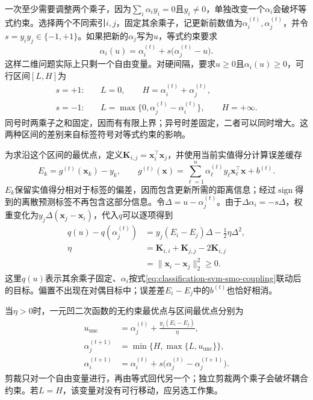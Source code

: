 一次至少需要调整两个乘子，因为$\sum_i\alpha_i y_i=0$且$y_i\ne0$，单独改变一个$\alpha_i$会破坏等式约束。选择两个不同索引$i,j$，固定其余乘子，记更新前数值为$\alpha_i^{(t)},\alpha_j^{(t)}$，并令$s=y_i y_j\in\{-1,+1\}$。如果把新的$\alpha_j$写为$u$，等式约束要求
\begin{equation}
  \alpha_i(u)
  =\alpha_i^{(t)}
    +s\bigl(\alpha_j^{(t)}-u\bigr).
  \label{eq:classification-svm-smo-coupling}
\end{equation}
这样二维问题实际上只剩一个自由变量。对硬间隔，要求$u\ge0$且$\alpha_i(u)\ge0$，可行区间$[L,H]$为
\begin{equation}
  \begin{aligned}
    s=+1:\quad&
      L=0,\qquad H=\alpha_i^{(t)}+\alpha_j^{(t)},\\
    s=-1:\quad&
      L=\max\{0,\alpha_j^{(t)}-\alpha_i^{(t)}\},
      \qquad H=+\infty.
  \end{aligned}
  \label{eq:classification-svm-smo-hard-interval}
\end{equation}
同号时两乘子之和固定，因而有有限上界；异号时差固定，二者可以同时增大。这两种区间的差别来自标签符号对等式约束的影响。

为求沿这个区间的最优点，定义$\bm{K}_{i,j}=\bm{x}_i^{\top}\bm{x}_j$，并使用当前实值得分计算误差缓存
\[
  E_k=g^{(t)}(\bm{x}_k)-y_k,\qquad
  g^{(t)}(\bm{x})
  =\sum_{\ell=1}^n\alpha_\ell^{(t)}
     y_\ell\bm{x}_\ell^{\top}\bm{x}+b^{(t)}.
\]
$E_k$保留实值得分相对于标签的偏差，因而包含更新所需的距离信息；经过$\operatorname{sign}$得到的离散预测标签不再包含这部分信息。令$\Delta=u-\alpha_j^{(t)}$。由于$\Delta\alpha_i=-s\Delta$，权重变化为$y_j\Delta(\bm{x}_j-\bm{x}_i)$，代入$q$可以逐项得到
\begin{equation}
  \begin{aligned}
    q(u)-q(\alpha_j^{(t)})
      &=y_j(E_i-E_j)\Delta-\frac12\eta\Delta^2,\\
    \eta
      &=\bm{K}_{i,i}+\bm{K}_{j,j}-2\bm{K}_{i,j}\\
      &=\lVert\bm{x}_i-\bm{x}_j\rVert_2^2\ge0.
  \end{aligned}
  \label{eq:classification-svm-smo-gain}
\end{equation}
这里$q(u)$表示其余乘子固定、$\alpha_i$按式\eqref{eq:classification-svm-smo-coupling}联动后的目标。偏置不出现在对偶目标中；误差差$E_i-E_j$中的$b^{(t)}$也恰好相消。

当$\eta>0$时，一元凹二次函数的无约束最优点与区间最优点分别为
\begin{equation}
  \begin{aligned}
    u_{\mathrm{unc}}
      &=\alpha_j^{(t)}+\frac{y_j(E_i-E_j)}{\eta},\\
    \alpha_j^{(t+1)}
      &=\min\{H,\max\{L,u_{\mathrm{unc}}\}\},\\
    \alpha_i^{(t+1)}
      &=\alpha_i^{(t)}
        +s\bigl(\alpha_j^{(t)}-\alpha_j^{(t+1)}\bigr).
  \end{aligned}
  \label{eq:classification-svm-smo-update}
\end{equation}
剪裁只对一个自由变量进行，再由等式回代另一个；独立剪裁两个乘子会破坏耦合约束。若$L=H$，该变量对没有可行移动，应另选工作集。

